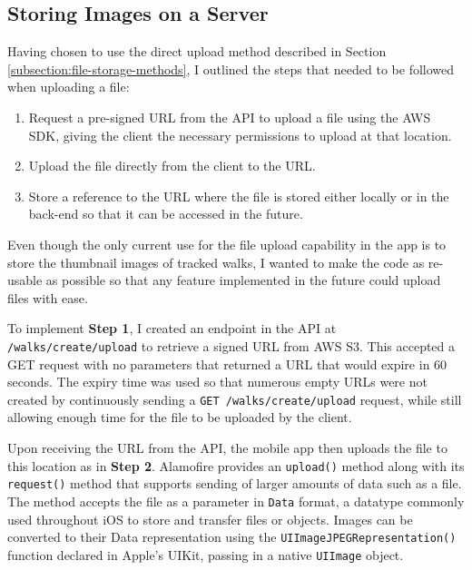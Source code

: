 \subsection{Storing Images on a Server} \label{implementation:storing-images}

Having chosen to use the direct upload method described in Section \ref{subsection:file-storage-methods}, I outlined the steps that needed to be followed when uploading a file:

\begin{enumerate}[label=\textbf{Step \arabic*}]
  \item Request a pre-signed URL from the API to upload a file using the AWS SDK, giving the client the necessary permissions to upload at that location.
  \item Upload the file directly from the client to the URL.
  \item Store a reference to the URL where the file is stored either locally or in the back-end so that it can be accessed in the future.
\end{enumerate}

Even though the only current use for the file upload capability in the app is to store the thumbnail images of tracked walks, I wanted to make the code as re-usable as possible so that any feature implemented in the future could upload files with ease.

To implement \textbf{Step 1}, I created an endpoint in the API at \texttt{/walks/create/upload} to retrieve a signed URL from AWS S3. This accepted a GET request with no parameters that returned a URL that would expire in 60 seconds. The expiry time was used so that numerous empty URLs were not created by continuously sending a \texttt{GET /walks/create/upload} request, while still allowing enough time for the file to be uploaded by the client.


Upon receiving the URL from the API, the mobile app then uploads the file to this location as in \textbf{Step 2}. Alamofire provides an \texttt{upload()} method along with its \texttt{request()} method that supports sending of larger amounts of data such as a file. The method accepts the file as a parameter in \texttt{Data} format, a datatype commonly used throughout iOS to store and transfer files or objects. Images can be converted to their Data representation using the \texttt{UIImageJPEGRepresentation()} function declared in Apple's UIKit, passing in a native \texttt{UIImage} object.

